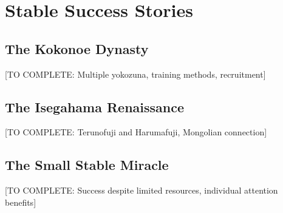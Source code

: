 \section{Stable Success Stories}

\subsection{The Kokonoe Dynasty}

[TO COMPLETE: Multiple yokozuna, training methods, recruitment]

\subsection{The Isegahama Renaissance}

[TO COMPLETE: Terunofuji and Harumafuji, Mongolian connection]

\subsection{The Small Stable Miracle}

[TO COMPLETE: Success despite limited resources, individual attention benefits]